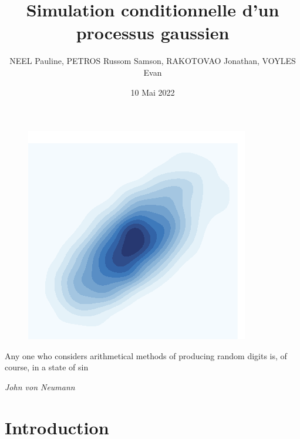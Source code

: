 \documentclass[10pt]{article} %
\title{Simulation conditionnelle d’un processus gaussien}
\author{NEEL Pauline, PETROS Russom Samson, RAKOTOVAO Jonathan, VOYLES Evan}
\date{10 Mai 2022}
\begin{document}
\begin{titlepage}

\maketitle

\begin{figure}[h!]
    \centering
    \includegraphics{media/plot.png}
\end{figure}

\vspace{3cm}





\epigraph{Any one who considers arithmetical methods of producing random digits is, of course, in a state of sin}
 {\textit{John von Neumann}}

\newpage

\end{titlepage}

\pagestyle{fancy}

\section{Introduction}
\end{document}
